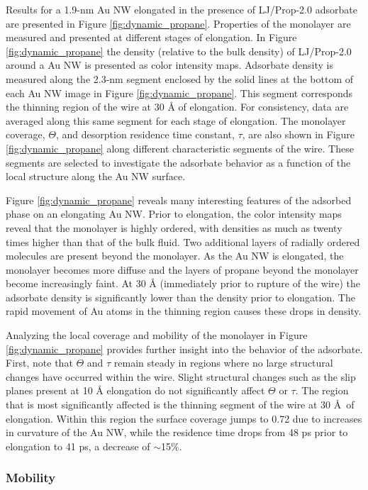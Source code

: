 \documentclass[10pt]{report}  %
\newcommand\findent{\hspace*{\parindent}}
\begin{document}
\findent Results for a 1.9-nm Au NW elongated in the presence of LJ/Prop-2.0 adsorbate are presented in Figure \ref{fig:dynamic_propane}.  Properties of the monolayer are measured and presented at different stages of elongation.  In Figure \ref{fig:dynamic_propane} the density (relative to the bulk density) of LJ/Prop-2.0 around a Au NW is presented as color intensity maps.  Adsorbate density is measured along the 2.3-nm segment enclosed by the solid lines at the bottom of each Au NW image in Figure \ref{fig:dynamic_propane}.  This segment corresponds the thinning region of the wire at 30 {\AA} of elongation.  For consistency, data are averaged along this same segment for each stage of elongation. The monolayer coverage, $\Theta$, and desorption residence time constant, $\tau$, are also shown in Figure \ref{fig:dynamic_propane} along different characteristic segments of the wire. These segments are selected to investigate the adsorbate behavior as a function of the local structure along the Au NW surface. 

Figure \ref{fig:dynamic_propane} reveals many interesting features of the adsorbed phase on an elongating Au NW.  Prior to elongation, the color intensity maps reveal that the monolayer is highly ordered, with densities as much as twenty times higher than that of the bulk fluid.  Two additional layers of radially ordered molecules are present beyond the monolayer.  As the Au NW is elongated, the monolayer becomes more diffuse and the layers of propane beyond the monolayer become increasingly faint. At 30 {\AA} (immediately prior to rupture of the wire) the adsorbate density is significantly lower than the density prior to elongation.  The rapid movement of Au atoms in the thinning region causes these drops in density. 

Analyzing the local coverage and mobility of the monolayer in Figure \ref{fig:dynamic_propane} provides further insight into the behavior of the adsorbate.  First, note that $\Theta$ and $\tau$ remain steady in regions where no large structural changes have occurred within the wire. Slight structural changes such as the slip planes present at 10 {\AA} elongation do not significantly affect $\Theta$ or $\tau$.  The region that is most significantly affected is the thinning segment of the wire at 30 \AA\ of elongation. Within this region the surface coverage jumps to 0.72 due to increases in curvature of the Au NW, while the residence time drops from 48 ps prior to elongation to 41 ps, a decrease of $\sim$15$\%$.

\subsubsection{Mobility}
\end{document}
